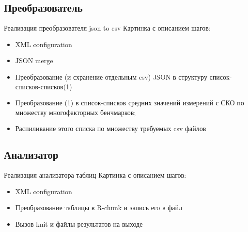 \subsection{Преобразователь}
\begin{frame}{Реализация преобразователя json to csv}
	Картинка с описанием шагов:
	\begin{itemize}
		\item XML configuration
		\item JSON merge
		\item Преобразование (и схранение отдельным csv) JSON в структуру список-списков-списков(1) 
		\item Преобразование (1) в список-списков средних значений измерений с СКО по множеству многофакторных бенчмарков;
		\item Распиливание этого списка по множеству требуемых csv файлов
	\end{itemize}
\end{frame}

\subsection{Анализатор}
\begin{frame}{Реализация анализатора таблиц}
	Картинка с описанием шагов:
	\begin{itemize}
		\item XML configuration
		\item Преобразование таблицы в R-chunk и запись его в файл
		\item Вызов knit и файлы результатов на выходе
	\end{itemize}
\end{frame}
